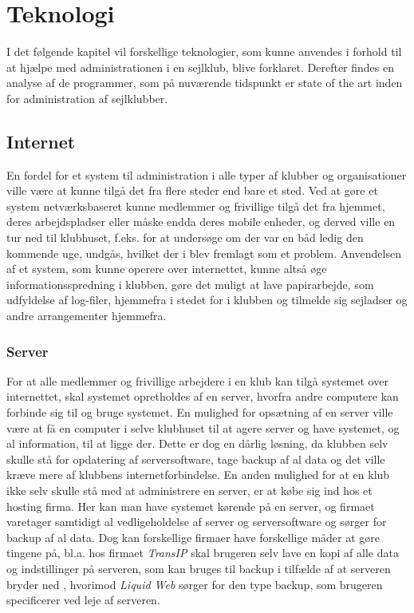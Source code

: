 \chapter{Teknologi}\label{chap:teknologi-analyse}

I det følgende kapitel vil forskellige teknologier, som kunne anvendes i forhold til at hjælpe med administrationen i en
sejlklub, blive forklaret. Derefter findes en analyse af de programmer, som på nuværende tidspunkt er state of the art
inden for administration af sejlklubber.


\section{Internet}
En fordel for et system til administration i alle typer af klubber og organisationer ville være at kunne tilgå det fra
flere steder end bare et sted. Ved at gøre et system netværksbaseret kunne medlemmer og frivillige tilgå det fra hjemmet, 
deres arbejdspladser eller måske endda deres mobile enheder, 
og derved ville en tur ned til klubhuset, f.eks. for at undersøge om der var en båd ledig den
kommende uge, undgås, hvilket der i  blev fremlagt som et problem. Anvendelsen
af et system, som kunne operere over internettet, kunne altså øge informationsspredning i klubben, gøre det muligt at lave
papirarbejde, som udfyldelse af log-filer, hjemmefra i stedet for i klubben og tilmelde sig sejladser og andre arrangementer
hjemmefra. 


\subsection*{Server}

For at alle medlemmer og frivillige arbejdere i en klub kan tilgå systemet over internettet, skal systemet opretholdes
af en server, hvorfra andre computere kan forbinde sig til og bruge systemet. En mulighed for opsætning af en server
ville være at få en computer i selve klubhuset til at agere server og have systemet, og al information, til at ligge der.
Dette er dog en dårlig løsning, da klubben selv skulle stå for opdatering af serversoftware, tage backup af al data og
det ville kræve mere af klubbens internetforbindelse. En anden mulighed for at en klub ikke selv skulle stå med at
administrere en server, er at købe sig ind hos et hosting firma. Her kan man have systemet kørende på en server, og firmaet
varetager samtidigt al vedligeholdelse af server og serversoftware og sørger for backup af al data. Dog kan forskellige
firmaer have forskellige måder at gøre tingene på, bl.a. hos firmaet \textit{TransIP} skal brugeren selv lave en kopi af alle
data og indstillinger på serveren, som kan bruges til backup i tilfælde af at serveren bryder ned \citep{Virtuelserver},
hvorimod \textit{Liquid Web} \citep{liquid} sørger for den type backup, som brugeren specificerer ved leje af serveren.

